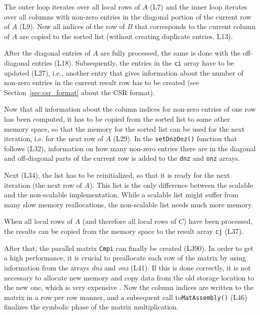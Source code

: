 The outer loop iterates over all local rows of $A$ (L7) and the inner loop iterates over all columns with non-zero entries in the diagonal portion of the current row of $A$ (L9). Now all indices of the row  of $B$ that corresponds to the current column of $A$ are copied to the sorted list (without creating duplicate entries, L13). 

After the diagonal entries of $A$ are fully processed, the same is done with the off-diagonal entries (L18). Subsequently, the entries in the \texttt{ci} array have to be updated (L27), i.e., another entry that gives information about the number of non-zero entries in the current result row has to be created (see Section~\ref{sec:csr_format} about the CSR format). 

Now that all information about the column indices for non-zero entries of one row has been computed,  it has to be copied from the sorted list to some other memory space, so that the memory for the sorted list can be used for the next iteration, i.e. for the next row of $A$ (L29). In the \texttt{setDnzOnz()} function that follows (L32), information on how many non-zero entries there are in the diagonal and off-diagonal parts of the current row is added to the \texttt{dnz} and \texttt{onz} arrays.

Next (L34), the list has to be reinitialized, so that it is ready for the next iteration (the next row of $A$). This list is the only difference between the scalable and the non-scalable implementation. While a scalable list might suffer from many slow memory reallocations, the non-scalable list needs much more memory.

When all local rows of $A$ (and therefore all local rows of $C$) have been processed, the results can be copied from the memory space to the result array \texttt{cj} (L37).

After that, the parallel matrix \texttt{Cmpi} can finally be created (L390). In order to get a high performance, it is crucial to preallocate each row of the matrix by using information from the arrays \textit{dnz} and \textit{onz} (L41). If this is done correctly, it is not necessary to allocate new memory and copy data from the old storage location to the new one, which is very expensive \cite{petsc-web-page}. Now the column indices are written to the matrix in a row per row manner, and a subsequent call to\texttt{MatAssembly()} (L46) finalizes the symbolic phase of the matrix multiplication.

\belowcaptionskip=-10pt



